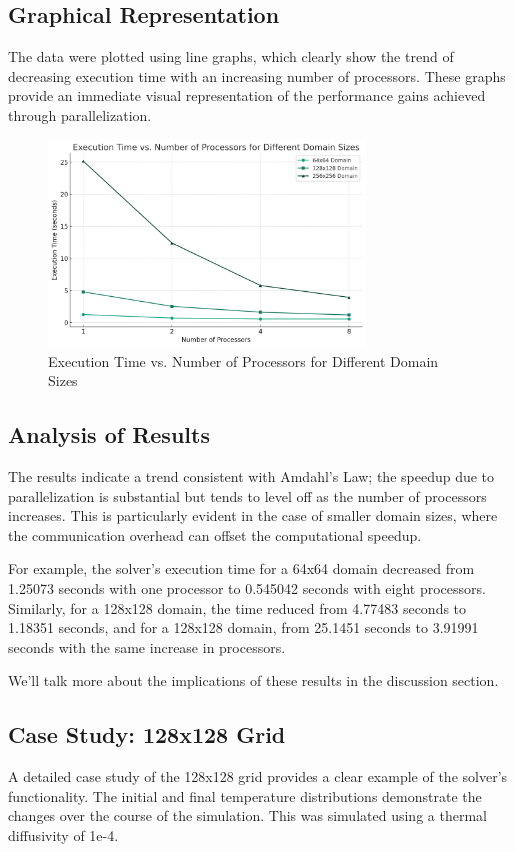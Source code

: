 \documentclass[11pt]{article}
\begin{document}
        \subsection{Graphical Representation}
        The data were plotted using line graphs, which clearly show the trend of decreasing execution time with an increasing number of processors. These graphs provide an immediate visual representation of the performance gains achieved through parallelization.

    \begin{figure}[ht]
        \centering
        \includegraphics[width=0.75\textwidth]{img/performance.png}
        \caption{Execution Time vs. Number of Processors for Different Domain Sizes}\label{fig:execution_time}
    \end{figure}

        \subsection{Analysis of Results}
        The results indicate a trend consistent with Amdahl's Law; the speedup due to parallelization is substantial but tends to level off as the number of processors increases. This is particularly evident in the case of smaller domain sizes, where the communication overhead can offset the computational speedup.

        For example, the solver's execution time for a 64x64 domain decreased from 1.25073 seconds with one processor to 0.545042 seconds with eight processors. Similarly, for a 128x128 domain, the time reduced from 4.77483 seconds to 1.18351 seconds, and for a 128x128 domain, from 25.1451 seconds to 3.91991 seconds with the same increase in processors.

        We'll talk more about the implications of these results in the discussion section.

        \subsection{Case Study: 128x128 Grid}
        A detailed case study of the 128x128 grid provides a clear example of the solver's functionality. The initial and final temperature distributions demonstrate the changes over the course of the simulation.
        This was simulated using a thermal diffusivity of 1e-4.
\end{document}
